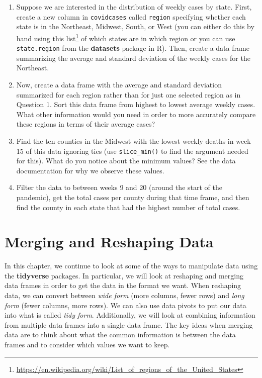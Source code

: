 \documentclass[
  letterpaper,
]{krantz}
\renewcommand{\href}[2]{#2\footnote{\url{#1}}}
\begin{document}
\begin{enumerate}
\def\labelenumi{\arabic{enumi}.}
\item
  Suppose we are interested in the distribution of weekly cases by
  state. First, create a new column in \texttt{covidcases} called
  \texttt{region} specifying whether each state is in the Northeast,
  Midwest, South, or West (you can either do this by hand using
  \href{https://en.wikipedia.org/wiki/List_of_regions_of_the_United_States}{this
  list} of which states are in which region or you can use
  \texttt{state.region} from the \textbf{datasets} package in R). Then,
  create a data frame summarizing the average and standard deviation of
  the weekly cases for the Northeast.
\item
  Now, create a data frame with the average and standard deviation
  summarized for each region rather than for just one selected region as
  in Question 1. Sort this data frame from highest to lowest average
  weekly cases. What other information would you need in order to more
  accurately compare these regions in terms of their average cases?
\item
  Find the ten counties in the Midwest with the lowest weekly deaths in
  week 15 of this data ignoring ties (use \texttt{slice\_min()} to find
  the argument needed for this). What do you notice about the minimum
  values? See the data documentation for why we observe these values.
\item
  Filter the data to between weeks 9 and 20 (around the start of the
  pandemic), get the total cases per county during that time frame, and
  then find the county in each state that had the highest number of
  total cases.
\end{enumerate}

\chapter{Merging and Reshaping Data}\label{sec-merging-reshaping}

In this chapter, we continue to look at some of the ways to manipulate
data using the \textbf{tidyverse} packages. In particular, we will look
at reshaping and merging data frames in order to get the data in the
format we want. When reshaping data, we can convert between \emph{wide
form} (more columns, fewer rows) and \emph{long form} (fewer columns,
more rows). We can also use data pivots to put our data into what is
called \emph{tidy form}. Additionally, we will look at combining
information from multiple data frames into a single data frame. The key
ideas when merging data are to think about what the common information
is between the data frames and to consider which values we want to keep.
\end{document}
